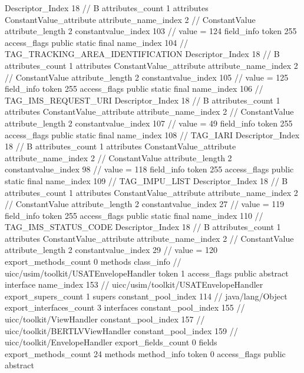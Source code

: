 {{{{{				Descriptor_Index	18		// B
				attributes_count	1
				attributes {
				ConstantValue_attribute {
					attribute_name_index	2		// ConstantValue
					attribute_length	2
					constantvalue_index	103		// value = 124
				}
				}
			}
			field_info {
				token	255
				access_flags	public static final
				name_index	104		// TAG_TRACKING_AREA_IDENTIFICATION
				Descriptor_Index	18		// B
				attributes_count	1
				attributes {
				ConstantValue_attribute {
					attribute_name_index	2		// ConstantValue
					attribute_length	2
					constantvalue_index	105		// value = 125
				}
				}
			}
			field_info {
				token	255
				access_flags	public static final
				name_index	106		// TAG_IMS_REQUEST_URI
				Descriptor_Index	18		// B
				attributes_count	1
				attributes {
				ConstantValue_attribute {
					attribute_name_index	2		// ConstantValue
					attribute_length	2
					constantvalue_index	107		// value = 49
				}
				}
			}
			field_info {
				token	255
				access_flags	public static final
				name_index	108		// TAG_IARI
				Descriptor_Index	18		// B
				attributes_count	1
				attributes {
				ConstantValue_attribute {
					attribute_name_index	2		// ConstantValue
					attribute_length	2
					constantvalue_index	98		// value = 118
				}
				}
			}
			field_info {
				token	255
				access_flags	public static final
				name_index	109		// TAG_IMPU_LIST
				Descriptor_Index	18		// B
				attributes_count	1
				attributes {
				ConstantValue_attribute {
					attribute_name_index	2		// ConstantValue
					attribute_length	2
					constantvalue_index	27		// value = 119
				}
				}
			}
			field_info {
				token	255
				access_flags	public static final
				name_index	110		// TAG_IMS_STATUS_CODE
				Descriptor_Index	18		// B
				attributes_count	1
				attributes {
				ConstantValue_attribute {
					attribute_name_index	2		// ConstantValue
					attribute_length	2
					constantvalue_index	29		// value = 120
				}
				}
			}
			}
			export_methods_count	0
			methods {
			}
		}
		class_info {		// uicc/usim/toolkit/USATEnvelopeHandler
			token	1
			access_flags	public abstract interface
			name_index	153		// uicc/usim/toolkit/USATEnvelopeHandler
			export_supers_count	1
			supers {
				constant_pool_index	114		// java/lang/Object
			}
			export_interfaces_count	3
			interfaces {
				constant_pool_index	155		// uicc/toolkit/ViewHandler
				constant_pool_index	157		// uicc/toolkit/BERTLVViewHandler
				constant_pool_index	159		// uicc/toolkit/EnvelopeHandler
			}
			export_fields_count	0
			fields {
			}
			export_methods_count	24
			methods {
				method_info {
					token	0
					access_flags	public abstract
}}}}}
